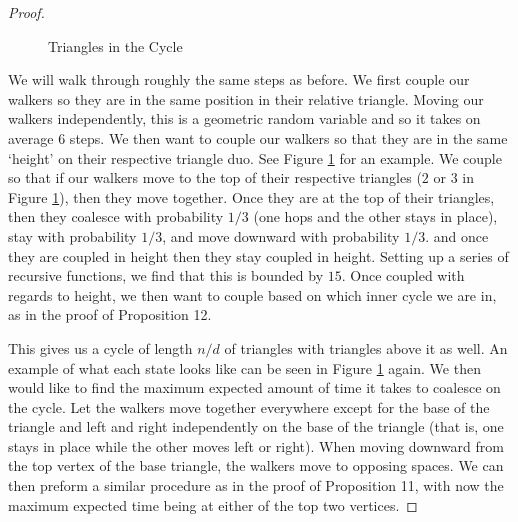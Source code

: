 \documentclass[10pt,a4paper]{amsart}
\theoremstyle{definition}
\numberwithin{definition}{section}
\begin{document}
\begin{proof}


\begin{figure}

    \caption{Triangles in the Cycle}
    \label{fig:graph12}
\end{figure}

We will walk through roughly the same steps as before. We first couple our walkers so they are in the same position in their relative triangle. Moving our walkers independently, this is a geometric random variable and so it takes on average $6$ steps. We then want to couple our walkers so that they are in the same `height' on their respective triangle duo. See Figure \ref{fig:graph12} for an example. We couple so that if our walkers move to the top of their respective triangles ($2$ or $3$ in Figure \ref{fig:graph12}), then they move together. Once they are at the top of their triangles, then they coalesce with probability $1/3$ (one hops and the other stays in place), stay with probability $1/3$, and move downward with probability $1/3$. and once they are coupled in height then they stay coupled in height. Setting up a series of recursive functions, we find that this is bounded by $15$. Once coupled with regards to height, we then want to couple based on which inner cycle we are in, as in the proof of Proposition 12.

This gives us a cycle of length $n/d$ of triangles with triangles above it as well. An example of what each state looks like can be seen in Figure \ref{fig:graph12} again. We then would like to find the maximum expected amount of time it takes to coalesce on the cycle. Let the walkers move together everywhere except for the base of the triangle and left and right independently on the base of the triangle (that is, one stays in place while the other moves left or right). When moving downward from the top vertex of the base triangle, the walkers move to opposing spaces. We can then preform a similar procedure as in the proof of Proposition 11, with now the maximum expected time being at either of the top two vertices. 


\end{proof}
\end{document}
